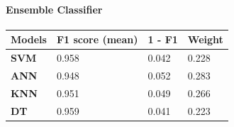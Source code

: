 \documentclass[runningheads]{llncs}
\begin{document}
\paragraph{Ensemble Classifier}
%
\begin{center}
\begin{table}[h]
\begin{tabular}{|C{3cm}|C{3cm}|C{3cm}|C{3cm}|}
\hline
{} 
{\color[HTML]{333333} \textbf{Models}} & {\color[HTML]{333333} \textbf{F1 score (mean)}} & {\color[HTML]{333333} \textbf{1 - F1}} & {\color[HTML]{333333} \textbf{Weight}} \\ \hline
{} 
\textbf{SVM}                                    & 0.958                                    & 0.042                                  & 0.228                                  \\ \hline
{} 
\textbf{ANN}                                    & 0.948                                    & 0.052                                  & 0.283                                  \\ \hline
{} 
\textbf{KNN}                                    & 0.951                                    & 0.049                                  & 0.266                                  \\ \hline
{} 
\textbf{DT}                                     & 0.959                                    & 0.041                                  & 0.223                                  \\ \hline
\end{tabular}
\end{table}
\end{center}
%
%
\end{document}
